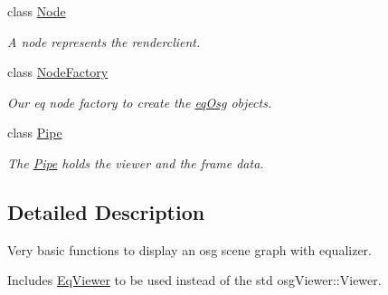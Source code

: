 \begin{CompactItemize}
class \hyperlink{a00012}{Node}
\begin{CompactList}\small\item\em A node represents the renderclient. \item\end{CompactList}\item 
class \hyperlink{a00013}{NodeFactory}
\begin{CompactList}\small\item\em Our eq node factory to create the \hyperlink{a00045}{eqOsg} objects. \item\end{CompactList}\item 
class \hyperlink{a00014}{Pipe}
\begin{CompactList}\small\item\em The \hyperlink{a00014}{Pipe} holds the viewer and the frame data. \item\end{CompactList}\end{CompactItemize}


\subsection{Detailed Description}
Very basic functions to display an osg scene graph with equalizer. 

Includes \hyperlink{a00009}{EqViewer} to be used instead of the std osgViewer::Viewer. 

